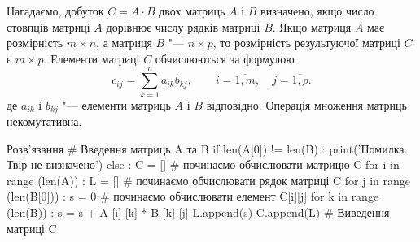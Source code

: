 Нагадаємо, добуток $C=A\cdot B$ двох матриць $A$ і $B$ визначено, якщо число стовпців матриці $A$ дорівнює числу рядків матриці $B$. Якщо матриця $A$ має розмірність $m\times n$, а матриця $B$ "--- $n\times p$, то розмірність результуючої матриці $C$ є $m\times p$. Елементи матриці $C$ обчислюються за формулою
$$
c_{ij}=\sum\limits_{k=1}^{n}a_{ik}b_{kj}, \qquad i=\overline{1, m}, \quad j=\overline{1, p}.
$$
де $a_{ik}$ і $b_{kj}$ "--- елементи матриць $A$ і $B$ відповідно. Операція множення матриць некомутативна.

\begin{py}{Розв'язання}
# Введення матриць A та B
if len(A[0]) != len(B) :
    print('Помилка. Твір не визначено')
else :
    C = [] # починаємо обчислювати матрицю C
    for i in range (len(A)) :
        L = [] # починаємо обчислювати рядок матриці C
        for j in range (len(B[0])) :
            s = 0 # починаємо обчислювати елемент C[i][j]
            for k in range (len(B)) :
                s = s + A [i] [k] * B [k] [j]
            L.append(s)
        C.append(L)
# Виведення матриці C
\end{py}


